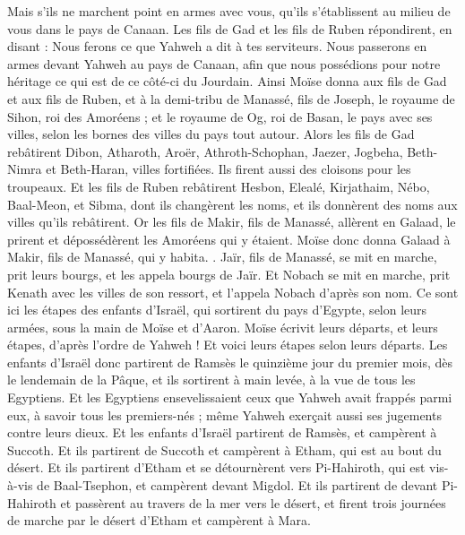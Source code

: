 \begin{multicols}{2}
Mais s'ils ne marchent point en armes avec vous, qu'ils s'établissent au milieu de vous dans le pays de Canaan.
Les fils de Gad et les fils de Ruben répondirent, en disant : Nous ferons ce que Yahweh a dit à tes serviteurs.
Nous passerons en armes devant Yahweh au pays de Canaan, afin que nous possédions pour notre héritage ce qui est de ce côté-ci du Jourdain.
Ainsi Moïse donna aux fils de Gad et aux fils de Ruben, et à la demi-tribu de Manassé, fils de Joseph, le royaume de Sihon, roi des Amoréens ; et le royaume de Og, roi de Basan, le pays avec ses villes, selon les bornes des villes du pays tout autour.
Alors les fils de Gad rebâtirent Dibon, Atharoth, Aroër,
Athroth-Schophan, Jaezer, Jogbeha,
Beth-Nimra et Beth-Haran, villes fortifiées. Ils firent aussi des cloisons pour les troupeaux.
Et les fils de Ruben rebâtirent Hesbon, Elealé, Kirjathaim,
Nébo, Baal-Meon, et Sibma, dont ils changèrent les noms, et ils donnèrent des noms aux villes qu'ils rebâtirent.
Or les fils de Makir, fils de Manassé, allèrent en Galaad, le prirent et dépossédèrent les Amoréens qui y étaient.
Moïse donc  donna Galaad à Makir, fils de Manassé, qui y habita.
.
Jaïr, fils de Manassé, se mit en marche, prit leurs bourgs, et les appela bourgs de Jaïr.
Et Nobach se mit en marche, prit Kenath avec les villes de son ressort, et l'appela Nobach d'après son nom.
\VerseOne{}Ce sont ici les étapes des enfants d'Israël, qui sortirent du pays d'Egypte, selon leurs armées, sous la main de Moïse et d'Aaron.
Moïse écrivit leurs départs, et leurs étapes, d'après l'ordre de Yahweh ! Et voici leurs étapes selon leurs départs.
Les enfants d'Israël donc partirent de Ramsès le quinzième jour du premier mois, dès le lendemain de la Pâque, et ils sortirent à main levée, à la vue de tous les Egyptiens.
Et les Egyptiens ensevelissaient ceux que Yahweh avait frappés parmi eux, à savoir tous les premiers-nés ; même Yahweh exerçait aussi ses jugements contre leurs dieux.
Et les enfants d'Israël partirent de Ramsès, et campèrent à Succoth.
Et ils partirent de Succoth et campèrent à Etham, qui est au bout du désert.
Et ils partirent d'Etham et se détournèrent vers Pi-Hahiroth, qui est vis-à-vis de Baal-Tsephon, et campèrent devant Migdol.
Et ils partirent de devant Pi-Hahiroth et passèrent au travers de la mer vers le désert, et firent trois journées de marche par le désert d'Etham et campèrent à Mara.

\end{multicols}
